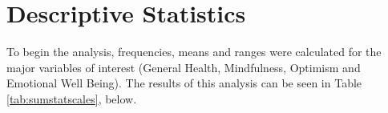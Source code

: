 \documentclass{article}
\begin{document}












\section{Descriptive Statistics}



To begin the analysis, frequencies, means and ranges were calculated
for the major variables of interest (General Health, Mindfulness, Optimism and Emotional Well Being).  The results of this analysis can
be seen in Table \ref{tab:sumstatscales}, below.
\end{document}
